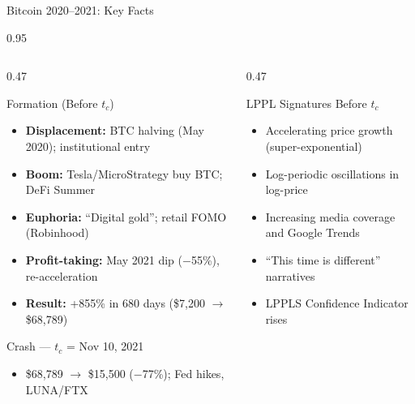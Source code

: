 \documentclass[9pt, aspectratio=169, t]{beamer}
\begin{document}
\begin{frame}{Bitcoin 2020--2021: Key Facts}
    \begin{cminipage}{0.95\textwidth}
    {\scriptsize
    \begin{columns}[T]
        \begin{column}{0.47\textwidth}
            \begin{block}{Formation (Before $t_c$)}
                \begin{itemize}\setlength{\itemsep}{0pt}
                    \item \textbf{Displacement:} BTC halving (May 2020); institutional entry
                    \item \textbf{Boom:} Tesla/MicroStrategy buy BTC; DeFi Summer
                    \item \textbf{Euphoria:} ``Digital gold''; retail FOMO (Robinhood)
                    \item \textbf{Profit-taking:} May 2021 dip ($-$55\%), re-acceleration
                    \item \textbf{Result:} +855\% in 680 days (\$7,200 $\to$ \$68,789)
                \end{itemize}
            \end{block}
            \vspace{-1mm}
            \begin{alertblock}{Crash --- $t_c$ = Nov 10, 2021}
                \begin{itemize}\setlength{\itemsep}{0pt}
                    \item \$68,789 $\to$ \$15,500 ($-$77\%); Fed hikes, LUNA/FTX
                \end{itemize}
            \end{alertblock}
        \end{column}
        \begin{column}{0.47\textwidth}
            \begin{exampleblock}{LPPL Signatures Before $t_c$}
                \begin{itemize}\setlength{\itemsep}{0pt}
                    \item Accelerating price growth (super-exponential)
                    \item Log-periodic oscillations in log-price
                    \item Increasing media coverage and Google Trends
                    \item ``This time is different'' narratives
                    \item LPPLS Confidence Indicator rises
                \end{itemize}
            \end{exampleblock}


\end{column}
\end{columns}}
\end{cminipage}
\end{frame}
\end{document}
